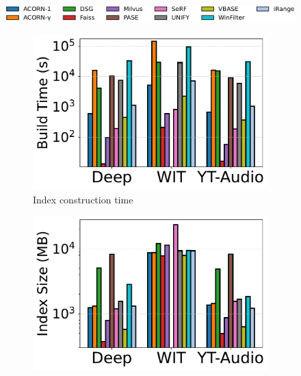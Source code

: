 \documentclass[sigconf, nonacm]{acmart}
\begin{document}
	\begin{figure}[t]
		\centering
		\setlength{\abovecaptionskip}{0.02cm}
		\setlength{\belowcaptionskip}{0.02cm}
		\hspace*{11pt}
		\includegraphics[width=0.93\columnwidth]{figures/indexData/rangeFilter_legend_only.pdf}
		
		
		\begin{subfigure}[t]{0.32\columnwidth}
			\centering
			\setlength{\abovecaptionskip}{0.02cm}
			\setlength{\belowcaptionskip}{0.02cm}
			\includegraphics[width=\linewidth]{figures/indexData/rangeFilter_build_time_comparison_query.pdf}
			\caption{Index construction time}
			\label{fig:rangeFilter_build_time}
		\end{subfigure}
		\hfill
		\begin{subfigure}[t]{0.32\columnwidth}
			\centering
			\setlength{\abovecaptionskip}{0.02cm}
			\setlength{\belowcaptionskip}{0.02cm}
			\includegraphics[width=\linewidth]{figures/indexData/rangeFilter_index_size_mb_comparison_query.pdf}

\end{subfigure}
\end{figure}
\end{document}
